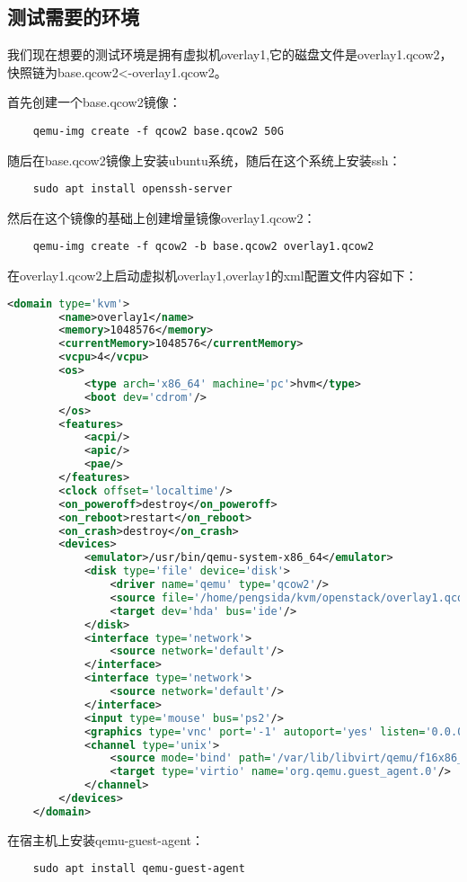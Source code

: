 \documentclass[a4paper,left=1.5cm,right=1.5cm,11pt]{article}
\begin{document}
\subsection{测试需要的环境}
	我们现在想要的测试环境是拥有虚拟机overlay1,它的磁盘文件是overlay1.qcow2，
	快照链为base.qcow2<-overlay1.qcow2。\par

	首先创建一个base.qcow2镜像：
	\begin{lstlisting}
	qemu-img create -f qcow2 base.qcow2 50G
	\end{lstlisting}

	随后在base.qcow2镜像上安装ubuntu系统，随后在这个系统上安装ssh：
	\begin{lstlisting}
	sudo apt install openssh-server
	\end{lstlisting}

	然后在这个镜像的基础上创建增量镜像overlay1.qcow2：
	\begin{lstlisting}
	qemu-img create -f qcow2 -b base.qcow2 overlay1.qcow2
	\end{lstlisting}

	在overlay1.qcow2上启动虚拟机overlay1,overlay1的xml配置文件内容如下：
	\begin{lstlisting}[language = xml]
	<domain type='kvm'>
		<name>overlay1</name>
		<memory>1048576</memory>
		<currentMemory>1048576</currentMemory>
		<vcpu>4</vcpu>
		<os>
			<type arch='x86_64' machine='pc'>hvm</type>
			<boot dev='cdrom'/>
		</os>
		<features>
			<acpi/>
			<apic/>
			<pae/>
		</features>
		<clock offset='localtime'/>
		<on_poweroff>destroy</on_poweroff>
		<on_reboot>restart</on_reboot>
		<on_crash>destroy</on_crash>
		<devices>
			<emulator>/usr/bin/qemu-system-x86_64</emulator>
			<disk type='file' device='disk'>
				<driver name='qemu' type='qcow2'/>
				<source file='/home/pengsida/kvm/openstack/overlay1.qcow2'/>
				<target dev='hda' bus='ide'/>
			</disk>
			<interface type='network'>
				<source network='default'/>
			</interface>
			<interface type='network'>
				<source network='default'/>
			</interface>
			<input type='mouse' bus='ps2'/>
			<graphics type='vnc' port='-1' autoport='yes' listen='0.0.0.0' keymap='en-us'/>
			<channel type='unix'>
				<source mode='bind' path='/var/lib/libvirt/qemu/f16x86_64.agent'/>
				<target type='virtio' name='org.qemu.guest_agent.0'/>
			</channel>
		</devices>
	</domain>
	\end{lstlisting}

	在宿主机上安装qemu-guest-agent：
	\begin{lstlisting}
	sudo apt install qemu-guest-agent
	\end{lstlisting}
\end{document}
